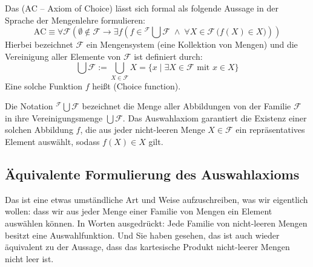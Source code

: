 \begin{math-stroke}
Das  ($\text{AC}$ -- Axiom of Choice) lässt sich formal als folgende Aussage in der Sprache der Mengenlehre formulieren:
\begin{equation}
\label{eq:axiom-of-choice}
\text{AC} \equiv \forall \mathcal{F} \left( \emptyset \notin \mathcal{F} \rightarrow \exists f \left( f \in {}^{\displaystyle\mathcal{F}}\!\bigcup \mathcal{F} \;\wedge\; \forall X \in \mathcal{F} \, \bigl( f(X) \in X \bigr) \right) \right)
\end{equation}
Hierbei bezeichnet $\mathcal{F}$ ein Mengensystem (eine Kollektion von Mengen) und die Vereinigung aller Elemente von $\mathcal{F}$ ist definiert durch:
\[
\bigcup \mathcal{F} := \bigcup_{X \in \mathcal{F}} X = \{ x \mid \exists X \in \mathcal{F} \text{ mit } x \in X \}
\]
Eine solche Funktion $f$ heißt  (Choice function).
\end{math-stroke}

\begin{didactic-insight}
Die Notation ${}^{\mathcal{F}}\!\bigcup \mathcal{F}$ bezeichnet die Menge aller Abbildungen von der Familie $\mathcal{F}$ in ihre Vereinigungsmenge $\bigcup \mathcal{F}$. Das Auswahlaxiom garantiert die Existenz einer solchen Abbildung $f$, die aus jeder nicht-leeren Menge $X \in \mathcal{F}$ ein repräsentatives Element auswählt, sodass $f(X) \in X$ gilt.
\end{didactic-insight}

\subsection{Äquivalente Formulierung des Auswahlaxioms}
\begin{spoken-clean}[00:02:40 - 00:03:50]
Das ist eine etwas umständliche Art und Weise aufzuschreiben, was wir eigentlich wollen: dass wir aus jeder Menge einer Familie von Mengen ein Element auswählen können. In Worten ausgedrückt: Jede Familie von nicht-leeren Mengen besitzt eine Auswahlfunktion. Und Sie haben gesehen, das ist auch wieder äquivalent zu der Aussage, dass das kartesische Produkt nicht-leerer Mengen nicht leer ist.
\end{spoken-clean}

\begin{math-stroke}
\end{math-stroke}


